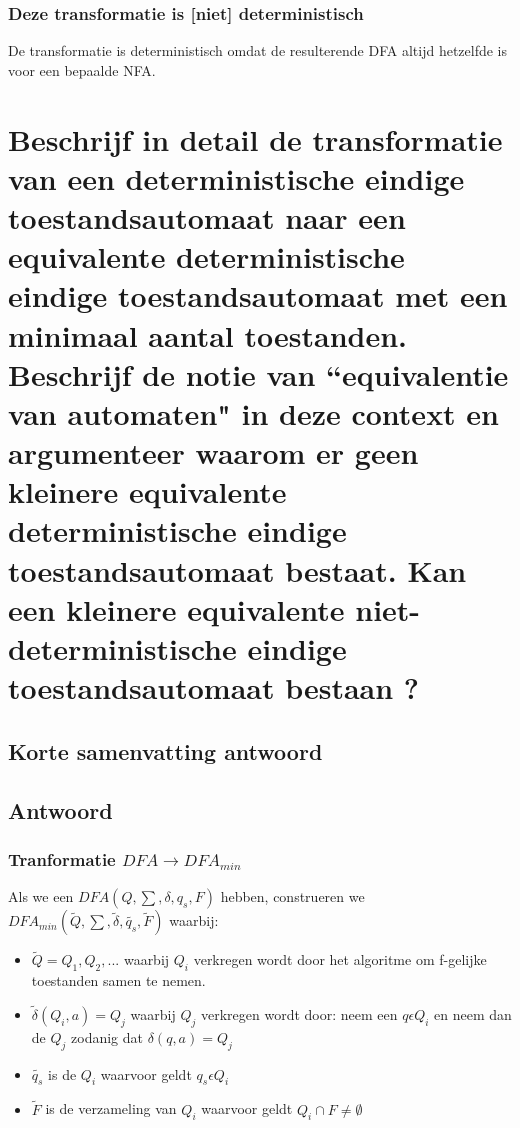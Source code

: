 \documentclass{article}
\begin{document}
            \subsubsection{Deze transformatie is [niet] deterministisch}
                De transformatie is deterministisch omdat de resulterende DFA altijd hetzelfde is voor een bepaalde NFA.
                

\newpage
\section{Beschrijf in detail de transformatie van een deterministische eindige toestandsautomaat naar een equivalente deterministische eindige toestandsautomaat met een minimaal aantal toestanden. Beschrijf de notie van ``equivalentie van automaten" in deze context en argumenteer waarom er geen kleinere equivalente deterministische eindige toestandsautomaat bestaat. Kan een kleinere equivalente niet-deterministische eindige toestandsautomaat bestaan ?}
    \subsection{Korte samenvatting antwoord}

    \subsection{Antwoord}
        \subsubsection{Tranformatie $DFA \rightarrow DFA_{min}$}
            Als we een $DFA(Q,\sum,\delta,q_s,F)$ hebben, construeren we $DFA_{min}(\tilde{Q}, \sum, \tilde{\delta}, \tilde{q_s}, \tilde{F})$ waarbij:
            \begin{itemize}
                \item $\tilde{Q} = {Q_1, Q_2,...}$ waarbij $Q_i$ verkregen wordt door het algoritme om f-gelijke toestanden samen te nemen.
                \item $\tilde{\delta}(Q_i, a) = Q_j$ waarbij $Q_j$ verkregen wordt door: neem een $q \epsilon Q_i$ en neem dan de $Q_j$ zodanig dat $\delta(q,a) = Q_j$
                \item $\tilde{q_s}$ is de $Q_i$ waarvoor geldt $q_s \epsilon Q_i$
                \item $\tilde{F}$ is de verzameling van $Q_i$ waarvoor geldt $Q_i \cap F \neq \emptyset$ 
            \end{itemize}
\end{document}
